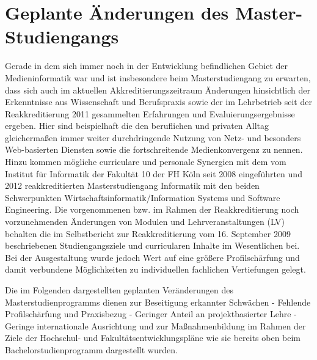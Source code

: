 \section{Geplante Änderungen des
Master-Studiengangs}\label{geplante-uxe4nderungen-des-master-studiengangs}

Gerade in dem sich immer noch in der Entwicklung befindlichen Gebiet der
Medieninformatik war und ist insbesondere beim Masterstudiengang zu
erwarten, dass sich auch im aktuellen Akkreditierungszeitraum Änderungen
hinsichtlich der Erkenntnisse aus Wissenschaft und Berufspraxis sowie
der im Lehrbetrieb seit der Reakkreditierung 2011 gesammelten
Erfahrungen und Evaluierungsergebnisse ergeben. Hier sind beispielhaft
die den beruflichen und privaten Alltag gleichermaßen immer weiter
durchdringende Nutzung von Netz- und besonders Web-basierten Diensten
sowie die fortschreitende Medienkonvergenz zu nennen. Hinzu kommen
mögliche curriculare und personale Synergien mit dem vom Institut für
Informatik der Fakultät 10 der FH Köln seit 2008 eingeführten und 2012
reakkreditierten Masterstudiengang Informatik mit den beiden
Schwerpunkten Wirtschaftsinformatik/Information Systems und Software
Engineering. Die vorgenommenen bzw. im Rahmen der Reakkreditierung noch
vorzunehmenden Änderungen von Modulen und Lehrveranstaltungen (LV)
behalten die im Selbstbericht zur Reakkreditierung vom 16. September
2009 beschriebenen Studiengangsziele und curricularen Inhalte im
Wesentlichen bei. Bei der Ausgestaltung wurde jedoch Wert auf eine
größere Profilschärfung und damit verbundene Möglichkeiten zu
individuellen fachlichen Vertiefungen gelegt.

Die im Folgenden dargestellten geplanten Veränderungen des
Masterstudienprogramms dienen zur Beseitigung erkannter Schwächen -
Fehlende Profilschärfung und Praxisbezug - Geringer Anteil an
projektbasierter Lehre - Geringe internationale Ausrichtung und zur
Maßnahmenbildung im Rahmen der Ziele der Hochschul- und
Fakultätsentwicklungspläne wie sie bereits oben beim
Bachelorstudienprogramm dargestellt wurden.


